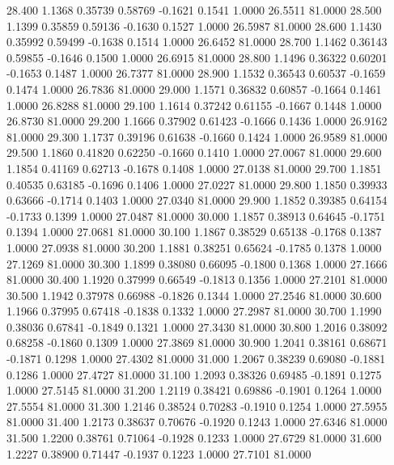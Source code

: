   28.400   1.1368   0.35739   0.58769  -0.1621   0.1541   1.0000  26.5511  81.0000
  28.500   1.1399   0.35859   0.59136  -0.1630   0.1527   1.0000  26.5987  81.0000
  28.600   1.1430   0.35992   0.59499  -0.1638   0.1514   1.0000  26.6452  81.0000
  28.700   1.1462   0.36143   0.59855  -0.1646   0.1500   1.0000  26.6915  81.0000
  28.800   1.1496   0.36322   0.60201  -0.1653   0.1487   1.0000  26.7377  81.0000
  28.900   1.1532   0.36543   0.60537  -0.1659   0.1474   1.0000  26.7836  81.0000
  29.000   1.1571   0.36832   0.60857  -0.1664   0.1461   1.0000  26.8288  81.0000
  29.100   1.1614   0.37242   0.61155  -0.1667   0.1448   1.0000  26.8730  81.0000
  29.200   1.1666   0.37902   0.61423  -0.1666   0.1436   1.0000  26.9162  81.0000
  29.300   1.1737   0.39196   0.61638  -0.1660   0.1424   1.0000  26.9589  81.0000
  29.500   1.1860   0.41820   0.62250  -0.1660   0.1410   1.0000  27.0067  81.0000
  29.600   1.1854   0.41169   0.62713  -0.1678   0.1408   1.0000  27.0138  81.0000
  29.700   1.1851   0.40535   0.63185  -0.1696   0.1406   1.0000  27.0227  81.0000
  29.800   1.1850   0.39933   0.63666  -0.1714   0.1403   1.0000  27.0340  81.0000
  29.900   1.1852   0.39385   0.64154  -0.1733   0.1399   1.0000  27.0487  81.0000
  30.000   1.1857   0.38913   0.64645  -0.1751   0.1394   1.0000  27.0681  81.0000
  30.100   1.1867   0.38529   0.65138  -0.1768   0.1387   1.0000  27.0938  81.0000
  30.200   1.1881   0.38251   0.65624  -0.1785   0.1378   1.0000  27.1269  81.0000
  30.300   1.1899   0.38080   0.66095  -0.1800   0.1368   1.0000  27.1666  81.0000
  30.400   1.1920   0.37999   0.66549  -0.1813   0.1356   1.0000  27.2101  81.0000
  30.500   1.1942   0.37978   0.66988  -0.1826   0.1344   1.0000  27.2546  81.0000
  30.600   1.1966   0.37995   0.67418  -0.1838   0.1332   1.0000  27.2987  81.0000
  30.700   1.1990   0.38036   0.67841  -0.1849   0.1321   1.0000  27.3430  81.0000
  30.800   1.2016   0.38092   0.68258  -0.1860   0.1309   1.0000  27.3869  81.0000
  30.900   1.2041   0.38161   0.68671  -0.1871   0.1298   1.0000  27.4302  81.0000
  31.000   1.2067   0.38239   0.69080  -0.1881   0.1286   1.0000  27.4727  81.0000
  31.100   1.2093   0.38326   0.69485  -0.1891   0.1275   1.0000  27.5145  81.0000
  31.200   1.2119   0.38421   0.69886  -0.1901   0.1264   1.0000  27.5554  81.0000
  31.300   1.2146   0.38524   0.70283  -0.1910   0.1254   1.0000  27.5955  81.0000
  31.400   1.2173   0.38637   0.70676  -0.1920   0.1243   1.0000  27.6346  81.0000
  31.500   1.2200   0.38761   0.71064  -0.1928   0.1233   1.0000  27.6729  81.0000
  31.600   1.2227   0.38900   0.71447  -0.1937   0.1223   1.0000  27.7101  81.0000
